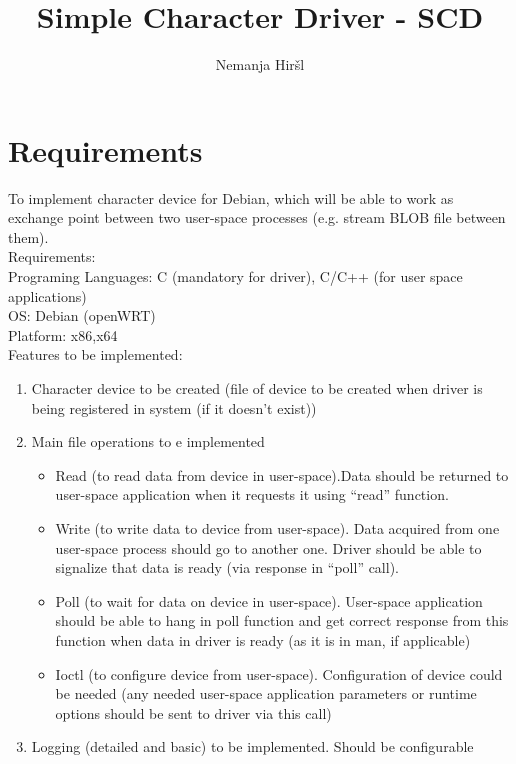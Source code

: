 \documentclass[11pt]{report}
\begin{document}
\title{Simple Character Driver - SCD}
\author{Nemanja Hiršl}

\maketitle
\tableofcontents
\newpage

\section{Requirements}
To implement character device for Debian, which will be able to work as exchange point between two user-space processes (e.g. stream BLOB file between them).\\
Requirements:\\
Programing Languages: C (mandatory for driver), C/C++ (for user space applications)\\
OS: Debian (openWRT) \\
Platform: x86,x64 \\
Features to be implemented:
\begin{enumerate}
\item Character device to be created (file of device to be created when driver is being registered in system (if it doesn’t exist))
\item Main file operations to e implemented
\begin{itemize}
\item Read (to read data from device in user-space).Data should be returned to user-space application when it requests it using “read” function.
\item Write (to write data to device from user-space). Data acquired from one user-space process should go to another one. Driver should be able to signalize that data is ready (via response in “poll” call).
\item Poll (to wait for data on device in user-space). User-space application should be able to  hang in poll function and get correct response from this function when data in driver is ready (as it is in man, if applicable)
\item Ioctl (to configure device from user-space). Configuration of device could be needed (any needed user-space application parameters or runtime options should be sent to driver via this call)
\end{itemize}
\item Logging (detailed and basic) to be implemented. Should be configurable
\end{enumerate}
\end{document}
